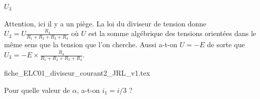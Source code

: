 \begin{enonce}
$U_3$
\end{enonce}


\begin{corrige}
Attention, ici il y a un piège. La loi du diviseur de tension donne $U_3=U\frac{R_4}{R_1+R_2+R_3+R_4}$ où $U$ est la somme algébrique des tensions orientées dans le même sens que la tension que l'on cherche. Aussi a-t-on  $U=-E$ de sorte que $U_3=-E\times\frac{R_4}{R_1+R_2+R_3+R_4}$.
\end{corrige}



\finEntrainement








\hauteurLargeurCadreReponse		{7mm}{15mm}
\initialisationEntrainement

\begin{center}
{fiche_ELC01_diviseur_courant2_JRL_v1.tex}
\end{center}

\minusSmallskip

\debutEntrainement


\begin{enonce}
Pour quelle valeur de $\alpha$, a-t-on $i_1=i/3$ ?
\end{enonce}

